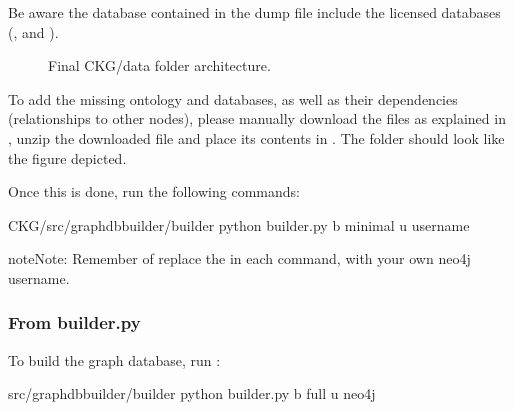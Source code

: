 \documentclass[letterpaper,10pt,english]{sphinxmanual}
\let\sphinxpxdimen\pdfpxdimen\else\newdimen\sphinxpxdimen
\begin{document}
Be aware the database contained in the dump file  include the licensed databases (,  and ).
\begin{wrapfigure}{r}{240\sphinxpxdimen}
\centering
\noindent\sphinxincludegraphics[width=240\sphinxpxdimen]{{data_folder}.png}
\caption{Final CKG/data folder architecture.}\label{\detokenize{intro/getting-started-with-build:id5}}\end{wrapfigure}

To add the missing ontology and databases, as well as their dependencies (relationships to other nodes), please manually download the files as explained in {\hyperref[\detokenize{intro/getting-started-with-build:build-neo4j-graph-database}]{}}, unzip the downloaded file  and place its contents in . The folder  should look like the figure depicted.

Once this is done, run the following commands:

\begin{sphinxVerbatim}[commandchars=\\\{\}]
\PYGZdl{}  CKG/src/graphdb\PYGZus{}builder/builder
\PYGZdl{} python builder.py \PYGZhy{}b minimal \PYGZhy{}u username
\end{sphinxVerbatim}

\begin{sphinxadmonition}{note}{Note:}
Remember of replace the  in each command, with your own neo4j username.
\end{sphinxadmonition}


\subsubsection{From builder.py}
\label{\detokenize{intro/getting-started-with-build:from-builder-py}}
To build the graph database, run :

\begin{sphinxVerbatim}[commandchars=\\\{\}]
\PYGZdl{}  src/graphdb\PYGZus{}builder/builder
\PYGZdl{} python builder.py \PYGZhy{}b full \PYGZhy{}u neo4j
\end{sphinxVerbatim}
\end{document}
